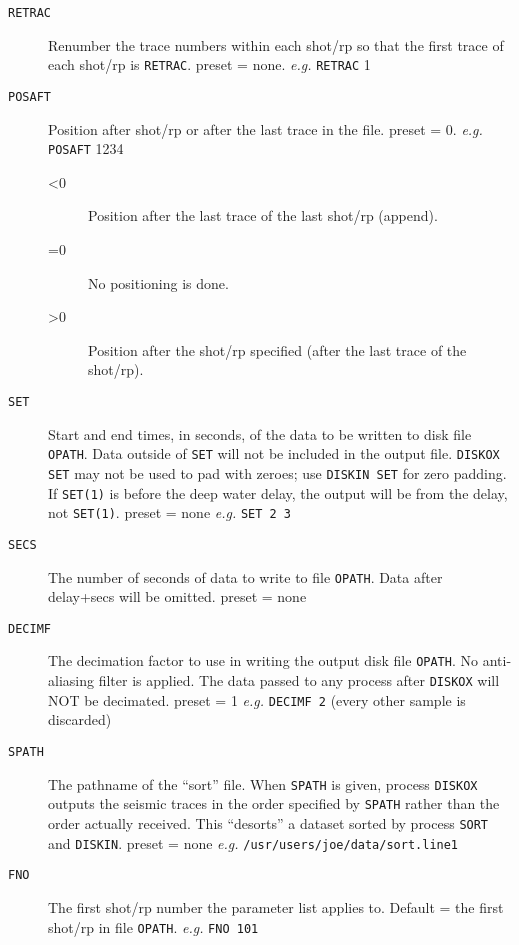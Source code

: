 \begin{description}
\item[\texttt{RETRAC}] Renumber the trace numbers within each \gls{shot}/\gls{rp} so that the first trace of each \gls{shot}/\gls{rp} is \texttt{RETRAC}.  \Gls{preset} = none. \textit{e.g.}     \texttt{RETRAC} 1

\item[\texttt{POSAFT}] Position after \gls{shot}/\gls{rp} or after the last trace in the file.  \Gls{preset} = 0.    \textit{e.g.}  \texttt{POSAFT} 1234
\begin{description}
    \item[<0] Position after the last trace of the last \gls{shot}/\gls{rp} (append).
    \item[=0] No positioning is done.
    \item[>0] Position after the \gls{shot}/\gls{rp} specified (after the last trace of the \gls{shot}/\gls{rp}).
\end{description}  

\item[\texttt{SET}]   Start and end times, in seconds, of the data to be written to disk file \texttt{OPATH}.  Data outside of \texttt{SET} will not be included in the output file.  \texttt{DISKOX SET} may not be used to pad with zeroes; use \texttt{DISKIN SET} for zero padding.  If \texttt{SET(1)} is before the deep water delay, the output will be from the delay, not \texttt{SET(1)}.  \Gls{preset} = none  \textit{e.g.}  \texttt{SET 2 3}

\item[\texttt{SECS}]  The number of seconds of data to write to file \texttt{OPATH}.  Data after delay+secs will be omitted.  \Gls{preset} = none

\item[\texttt{DECIMF}]The decimation factor to use in writing the output disk file \texttt{OPATH}.  No anti-aliasing filter is applied.  The data passed to any process after \texttt{DISKOX} will NOT be decimated.  \Gls{preset} = 1  \textit{e.g.} \texttt{DECIMF 2}  (every other sample is discarded)

\item[\texttt{SPATH}] The pathname of the ``sort'' file.  When \texttt{SPATH} is given, process \texttt{DISKOX} outputs the seismic traces in the order specified by \texttt{SPATH} rather than the order actually received. This ``desorts'' a dataset sorted by process \texttt{SORT} and \texttt{DISKIN}.  \Gls{preset} = none  \textit{e.g.} \texttt{/usr/users/joe/data/sort.line1}

\item[\texttt{FNO}]   The first \gls{shot}/\gls{rp} number the parameter list applies to.  Default = the first \gls{shot}/\gls{rp} in file \texttt{OPATH}.   \textit{e.g.}   \texttt{FNO 101}


\end{description}
